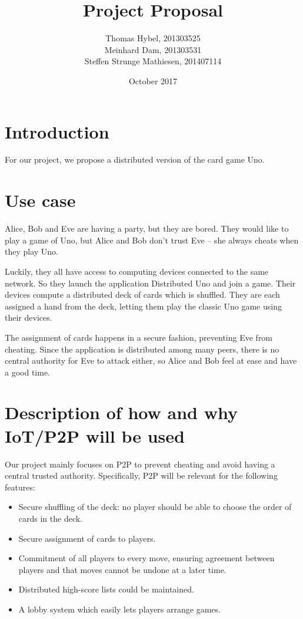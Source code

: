 \documentclass{article}
\title{Project Proposal}
\author{Thomas Hybel, 201303525 \\
Meinhard Dam, 201303531 \\
Steffen Strunge Mathiesen, 201407114}
\date{October 2017}
\begin{document}
\maketitle

\section*{Introduction}
For our project, we propose a distributed version of the card game Uno.

\section*{Use case}
Alice, Bob and Eve are having a party, but they are bored. They would like to
play a game of Uno, but Alice and Bob don't trust Eve -- she always cheats
when they play Uno.

Luckily, they all have access to computing devices connected to the same
network. So they launch the application Distributed Uno and join a game. Their
devices compute a distributed deck of cards which is shuffled. They are each
assigned a hand from the deck, letting them play the classic Uno game using
their devices.

The assignment of cards happens in a secure fashion, preventing Eve from
cheating. Since the application is distributed among many peers, there is no
central authority for Eve to attack either, so Alice and Bob feel at ease and
have a good time.


\section*{Description of how and why IoT/P2P will be used}
Our project mainly focuses on P2P to prevent cheating and avoid having a
central trusted authority. Specifically, P2P will be relevant for the
following features:
\begin{itemize}
\item Secure shuffling of the deck: no player should be able to choose the
order of cards in the deck.
\item Secure assignment of cards to players.
\item Commitment of all players to every move, ensuring agreement between
players and that moves cannot be undone at a later time.
\item Distributed high-score lists could be maintained.
\item A lobby system which easily lets players arrange games.
\end{itemize}
\end{document}
